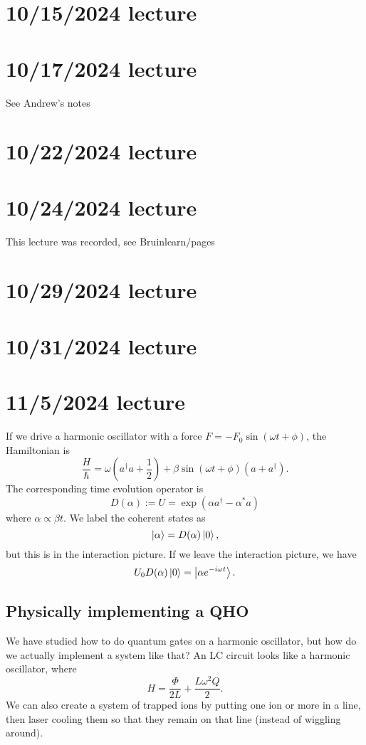 \documentclass{article}
\begin{document}
\section{10/15/2024 lecture}

\section{10/17/2024 lecture}
See Andrew's notes

\section{10/22/2024 lecture}

\section{10/24/2024 lecture}
This lecture was recorded, see Bruinlearn/pages

\section{10/29/2024 lecture}

\section{10/31/2024 lecture}

\section{11/5/2024 lecture}
If we drive a harmonic oscillator with a force $F=-F_0\sin(\omega t + \phi)$, the Hamiltonian is
\[ \frac{H}{\hbar} = \omega (a^\dag a + \frac{1}{2}) + \beta \sin (\omega t + \phi) (a + a^\dag). \]
The corresponding time evolution operator is
\[ D(\alpha) := U = \exp \left( \alpha a^\dag - \alpha^* a \right) \]
where $\alpha \propto \beta t$. We label the coherent states as
\[ \left\lvert \alpha \right\rangle = D(\alpha) \left\lvert 0 \right\rangle, \]
but this is in the interaction picture. If we leave the interaction picture, we have
\[ U_0 D(\alpha) \left\lvert 0 \right\rangle = \left\lvert \alpha e^{-i \omega t} \right\rangle. \]

\subsection{Physically implementing a QHO}
We have studied how to do quantum gates on a harmonic oscillator, but how do we actually implement a system like that? An LC circuit looks like a harmonic oscillator, where
\[ H = \frac{\Phi}{2L} + \frac{L \omega^2 Q}{2}. \]
We can also create a system of trapped ions by putting one ion or more in a line, then laser cooling them so that they remain on that line (instead of wiggling around).
\end{document}
